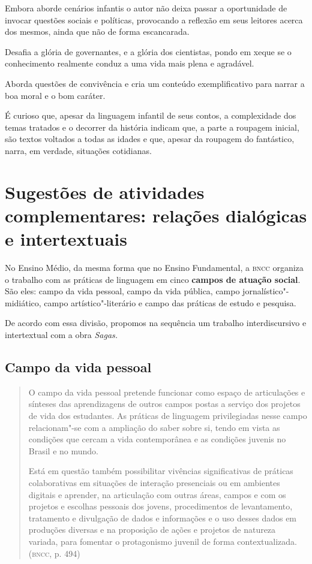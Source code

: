 \documentclass[12pt]{extarticle}
\begin{document}
Embora aborde cenários infantis o autor não deixa passar a oportunidade
de invocar questões sociais e políticas, provocando a reflexão em seus
leitores acerca dos mesmos, ainda que não de forma escancarada.

Desafia a glória de governantes, e a glória dos cientistas, pondo em
xeque se o conhecimento realmente conduz a uma vida mais plena e
agradável.

Aborda questões de convivência e cria um conteúdo exemplificativo para
narrar a boa moral e o bom caráter.

É curioso que, apesar da linguagem infantil de seus contos, a
complexidade dos temas tratados e o decorrer da história indicam que, a
parte a roupagem inicial, são textos voltados a todas as idades e que,
apesar da roupagem do fantástico, narra, em verdade, situações
cotidianas.

\section{Sugestões de atividades complementares: relações dialógicas e
intertextuais}


No Ensino Médio, da mesma forma que no Ensino Fundamental, a \textsc{bncc}
organiza o trabalho com as práticas de linguagem em cinco \textbf{campos
de atuação social}. São eles: campo da vida pessoal, campo da vida
pública, campo jornalístico"-midiático, campo artístico"-literário e campo
das práticas de estudo e pesquisa.

De acordo com essa divisão, propomos na sequência um trabalho
interdiscursivo e intertextual com a obra \emph{Sagas.}



\subsection{Campo da vida pessoal}

\begin{quote}
O campo da vida pessoal pretende funcionar como espaço de articulações
e sínteses das aprendizagens de outros campos postas a serviço dos
projetos de vida dos estudantes. As práticas de linguagem privilegiadas
nesse campo relacionam"-se com a ampliação do saber sobre si, tendo em
vista as condições que cercam a vida contemporânea e as condições
juvenis no Brasil e no mundo.

Está em questão também possibilitar vivências significativas de práticas
colaborativas em situações de interação presenciais ou em ambientes
digitais e aprender, na articulação com outras áreas, campos e com os
projetos e escolhas pessoais dos jovens, procedimentos de levantamento,
tratamento e divulgação de dados e informações e o uso desses dados em
produções diversas e na proposição de ações e projetos de natureza
variada, para fomentar o protagonismo juvenil de forma
contextualizada. (\textsc{bncc}, p. 494)
\end{quote}
\end{document}
